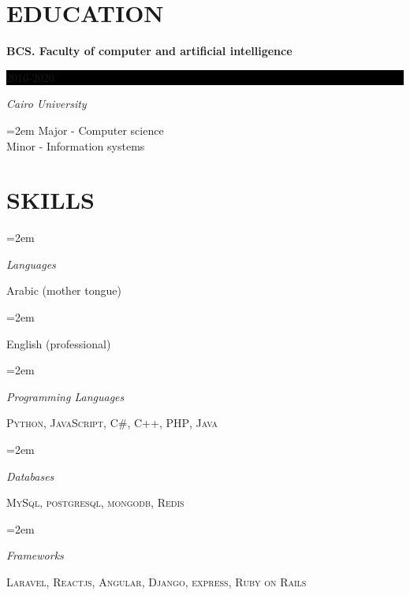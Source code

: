 \documentclass[paper=a4,fontsize=11pt]{scrartcl} %
\newlength{\spacebox}
\newcommand{\sepspace}{\vspace*{1em}}		%
\newcommand{\NewPart}[1]{\section*{\uppercase{#1}}}
\newcommand{\PersonalEntry}[2]{
		\noindent\hangindent=1em\hangafter=0 %
		\parbox{\spacebox}{        %
		\textit{#1}}		       %
		\hspace{1.5em} #2 \par}    %
\newcommand{\SkillsEntry}[2]{      %
		\noindent\hangindent=2em\hangafter=0 %
		\parbox{\spacebox}{        %
		\textit{#1}}			   %
		\hspace{1.5em} #2 \par}    %
\newcommand{\EducationEntry}[4]{
		\noindent \textbf{#1} \hfill      %
		\colorbox{Black}{%
			\parbox{6em}{%
			\hfill\color{White}#2}} \par  %
		\noindent \textit{#3} \par        %
		\noindent\hangindent=2em\hangafter=0 \small #4 %
		\normalsize \par}
\begin{document}
\NewPart{Education}{}

\EducationEntry{BCS. Faculty of computer and artificial intelligence}{2016-2020}{Cairo
  University}{Major - Computer science \\ Minor - Information systems}
\sepspace

\NewPart{Skills}{
\SkillsEntry{Languages}{Arabic (mother tongue)}
\SkillsEntry{}{English (professional)}

\sepspace
\SkillsEntry{Programming Languages}{\textsc{Python}, \textsc{JavaScript},  \textsc{C\#}, \textsc{C++},  \textsc{PHP}, \textsc{Java}}
\sepspace


\SkillsEntry{Databases}{\textsc{MySql}, \textsc{postgresql}, \textsc{mongodb}, \textsc{Redis}}

\sepspace


\SkillsEntry{Frameworks}{\textsc{Laravel}, \textsc{Reactjs}, \textsc{Angular}, \textsc{Django}, \textsc{express}, \textsc{Ruby on Rails}}

}
\end{document}
